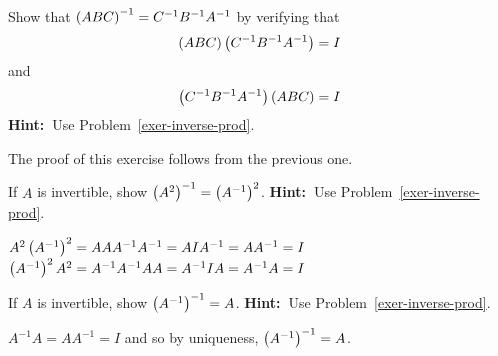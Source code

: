 \begin{enumialphparenastyle}
\begin{ex}Show that $\left(ABC\right) ^{-1}=C^{-1}B^{-1}A^{-1}$ by verifying
that 
\[
\left(ABC\right) \left(C^{-1}B^{-1}A^{-1}\right) =I
\]
and 
\[\left(C^{-1}B^{-1}A^{-1}\right)\left(ABC\right) =I
\] 
\textbf{Hint:\ }Use Problem~\ref{exer-inverse-prod}. 
\begin{sol}
The proof of this exercise follows from the previous one.
\end{sol}
\end{ex}

\begin{ex}If $A$ is invertible, show $\left(A^{2}\right) ^{-1}=\left(
A^{-1}\right) ^{2}$. \textbf{Hint:\ }Use Problem~\ref{exer-inverse-prod}. 
\begin{sol}
$A^{2}\left(A^{-1}\right) ^{2}=AAA^{-1}A^{-1}=AIA^{-1}=AA^{-1}=I$ $\left(
A^{-1}\right) ^{2}A^{2}=A^{-1}A^{-1}AA=A^{-1}IA=A^{-1}A=I$
\end{sol}
\end{ex}

\begin{ex}If $A$ is invertible, show $\left(A^{-1}\right) ^{-1}=A$. 
\textbf{Hint:\ }Use Problem~\ref{exer-inverse-prod}. 
\begin{sol}
 $A^{-1}A=AA^{-1}=I$ and so by
uniqueness, $\left(A^{-1}\right) ^{-1}=A$.
\end{sol}
\end{ex}

\end{enumialphparenastyle}
